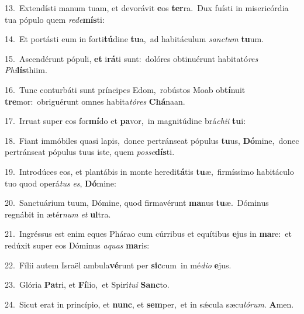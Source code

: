 {\numbfont\textcolor{\numbcolor}{13.}}~Extendísti manum tuam, et devorávit \textbf{e}\-os \textbf{ter}\-ra.~\star Dux fuísti in misericórdia tua pópulo quem \textit{red}\-\textit{e}\textbf{mís}ti:\par
{\numbfont\textcolor{\numbcolor}{14.}}~Et portásti eum in forti\-\textbf{tú}\-dine \textbf{tu}\-a,~\star ad habitáculum \textit{sanc}\-\textit{tum} \textbf{tu}\-um.\par
{\numbfont\textcolor{\numbcolor}{15.}}~Ascendérunt pópuli, \textbf{et} i\-\textbf{rá}\-ti sunt:~\star dolóres obtinuérunt habitató\textit{res} \textit{Phi}\-\textbf{lís}thiim.\par
{\numbfont\textcolor{\numbcolor}{16.}}~Tunc conturbáti sunt príncipes Edom,~\dagger robústos Moab ob\-\textbf{tí}\-nuit \textbf{tre}\-mor:~\star obriguérunt omnes habita\-\textit{tó}\-\textit{res} \textbf{Chá}\-naan.\par
{\numbfont\textcolor{\numbcolor}{17.}}~Irruat super eos for\-\textbf{mí}\-do et \textbf{pa}\-vor,~\star in magnitúdine brá\-\textit{chi}\-\textit{i} \textbf{tu}\-i:\par
{\numbfont\textcolor{\numbcolor}{18.}}~Fiant immóbiles quasi lapis,~\dagger donec pertránseat pópulus \textbf{tu}\-us, \textbf{Dó}\-mine,~\star donec pertránseat pópulus tuus iste, quem \textit{pos}\-\textit{se}\textbf{dís}ti.\par
{\numbfont\textcolor{\numbcolor}{19.}}~Introdúces eos, et plantábis in monte heredi\-\textbf{tá}\-tis \textbf{tu}\-æ,~\star firmíssimo habitáculo tuo quod operá\textit{tus} \textit{es}\-, \textbf{Dó}\-mine:\par
{\numbfont\textcolor{\numbcolor}{20.}}~Sanctuárium tuum, Dómine, quod firmavérunt \textbf{ma}\-nus \textbf{tu}\-æ.~\star Dóminus regnábit in ætér\textit{num} \textit{et} \textbf{ul}\-tra.\par
{\numbfont\textcolor{\numbcolor}{21.}}~Ingréssus est enim eques Phárao cum cúrribus et equítibus \textbf{e}\-jus in \textbf{ma}\-re:~\star et redúxit super eos Dóminus \textit{a}\-\textit{quas} \textbf{ma}\-ris:\par
{\numbfont\textcolor{\numbcolor}{22.}}~Fílii autem Israël ambula\-\textbf{vé}\-runt per \textbf{sic}\-cum~\star in mé\-\textit{di}\-\textit{o} \textbf{e}\-jus.\par
{\numbfont\textcolor{\numbcolor}{23.}}~Glória \textbf{Pa}\-tri, et \textbf{Fí}\-lio,~\star et Spirí\-\textit{tu}\-\textit{i} \textbf{Sanc}\-to.\par
{\numbfont\textcolor{\numbcolor}{24.}}~Sicut erat in princípio, et \textbf{nunc}\-, et \textbf{sem}\-per,~\star et in sǽcula sæcu\-\textit{ló}\-\textit{rum}. \textbf{A}\-men.\par

